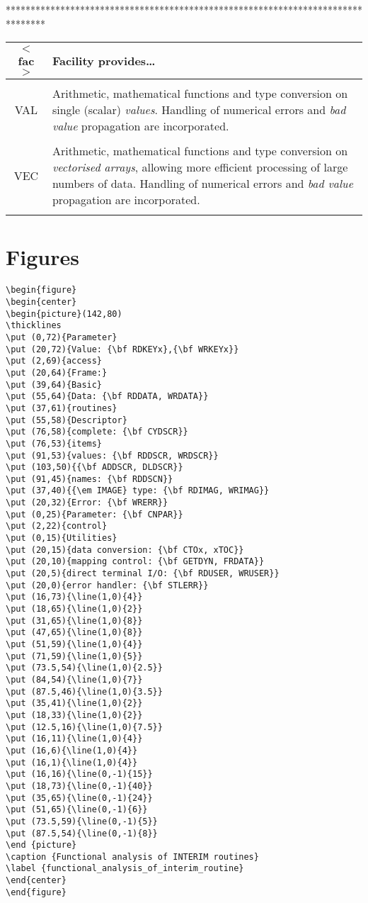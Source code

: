 ********************************************************************************

\begin{center}
\begin{tabular}{c|p{33em}}
{\bf $<$fac$>$} & {\bf Facility provides\ldots } \\
\hline
\\
VAL & Arithmetic, mathematical functions and type conversion on single 
(scalar) {\em values}.
Handling of numerical errors and {\em bad value} propagation are
incorporated.\\ 
\\ 
VEC & Arithmetic, mathematical functions and type conversion on {\em
vectorised arrays}, allowing more efficient processing of large numbers of
data. 
Handling of numerical errors and {\em bad value} propagation are
incorporated.\\ 
\\ 
\end{tabular}
\end{center}

\newpage

\section{Figures}

\begin{verbatim}
\begin{figure}
\begin{center}
\begin{picture}(142,80)
\thicklines
\put (0,72){Parameter}
\put (20,72){Value: {\bf RDKEYx},{\bf WRKEYx}}
\put (2,69){access}
\put (20,64){Frame:}
\put (39,64){Basic}
\put (55,64){Data: {\bf RDDATA, WRDATA}}
\put (37,61){routines}
\put (55,58){Descriptor}
\put (76,58){complete: {\bf CYDSCR}}
\put (76,53){items}
\put (91,53){values: {\bf RDDSCR, WRDSCR}}
\put (103,50){{\bf ADDSCR, DLDSCR}}
\put (91,45){names: {\bf RDDSCN}}
\put (37,40){{\em IMAGE} type: {\bf RDIMAG, WRIMAG}}
\put (20,32){Error: {\bf WRERR}}
\put (0,25){Parameter: {\bf CNPAR}}
\put (2,22){control}
\put (0,15){Utilities}
\put (20,15){data conversion: {\bf CTOx, xTOC}}
\put (20,10){mapping control: {\bf GETDYN, FRDATA}}
\put (20,5){direct terminal I/O: {\bf RDUSER, WRUSER}}
\put (20,0){error handler: {\bf STLERR}}
\put (16,73){\line(1,0){4}}
\put (18,65){\line(1,0){2}}
\put (31,65){\line(1,0){8}}
\put (47,65){\line(1,0){8}}
\put (51,59){\line(1,0){4}}
\put (71,59){\line(1,0){5}}
\put (73.5,54){\line(1,0){2.5}}
\put (84,54){\line(1,0){7}}
\put (87.5,46){\line(1,0){3.5}}
\put (35,41){\line(1,0){2}}
\put (18,33){\line(1,0){2}}
\put (12.5,16){\line(1,0){7.5}}
\put (16,11){\line(1,0){4}}
\put (16,6){\line(1,0){4}}
\put (16,1){\line(1,0){4}}
\put (16,16){\line(0,-1){15}}
\put (18,73){\line(0,-1){40}}
\put (35,65){\line(0,-1){24}}
\put (51,65){\line(0,-1){6}}
\put (73.5,59){\line(0,-1){5}}
\put (87.5,54){\line(0,-1){8}}
\end {picture}
\caption {Functional analysis of INTERIM routines}
\label {functional_analysis_of_interim_routine}
\end{center}
\end{figure}
\end{verbatim}


